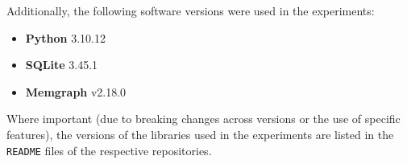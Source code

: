 Additionally, the following software versions were used in the experiments:

\begin{itemize}
    \item \textbf{Python} 3.10.12
    \item \textbf{SQLite} 3.45.1
    \item \textbf{Memgraph} v2.18.0
\end{itemize}

Where important (due to breaking changes across versions or the use of specific features), 
the versions of the libraries used in the experiments are listed in the \texttt{README} files of the respective repositories.
